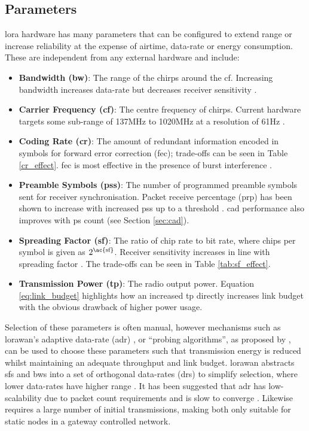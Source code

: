 \subsection{Parameters}
\ac{lora} hardware has many parameters that can be configured to extend range or increase reliability at the expense of airtime, data-rate or energy consumption. These are independent from any external hardware and include:
\begin{itemize}
    \item \textbf{Bandwidth (\ac{bw})}: The range of the chirps around the \ac{cf}. Increasing bandwidth increases data-rate but decreases receiver sensitivity \cite{3YP:STUDY_OF_LORA}.
    \item \textbf{Carrier Frequency (\ac{cf})}: The centre frequency of chirps. Current hardware targets some sub-range of 137MHz to 1020MHz at a resolution of 61Hz \cite{3YP:LORA_SX12}. 
    \item \textbf{Coding Rate (\ac{cr})}: The amount of redundant information encoded in symbols for forward error correction (\ac{fec}); trade-offs can be seen in Table \ref{cr_effect}. \ac{fec} is most effective in the presence of burst interference \cite{3YP:LORA_MOD_BASICS}.
    \item \textbf{Preamble Symbols (\ac{ps}s)}: The number of programmed preamble symbols sent for receiver synchronisation. Packet receive percentage (\ac{prp}) has been shown to increase with increased \ac{ps}s up to a threshold \cite{3YP:LORA_PERFORMANCE}. \ac{cad} performance also improves with \ac{ps} count (see Section \ref{sec:cad}).
    \item \textbf{Spreading Factor (\ac{sf})}: The ratio of chip rate to bit rate, where chips per symbol is given as $2^{\text{\ac{sf}}}$. Receiver sensitivity increases in line with spreading factor \cite{3YP:LORA_SX12}. The trade-offs can be seen in Table \ref{tab:sf_effect}.
    \item \textbf{Transmission Power (\ac{tp})}: The radio output power. Equation \ref{eq:link_budget} highlights how an increased \ac{tp} directly increases link budget with the obvious drawback of higher power usage. 
\end{itemize}

\label{sec:parameter_selection}
Selection of these parameters is often manual, however mechanisms such as \ac{lorawan}'s adaptive data-rate (\ac{adr}) \cite{3YP:LORAWAN}, or ``probing algorithms'', as proposed by \cite{3YP:CHOOSING_LORA_PARAMETERS}, can be used to choose these parameters such that transmission energy is reduced whilst maintaining an adequate throughput and link budget. \ac{lorawan} abstracts \ac{sf}s and \ac{bw}s into a set of orthogonal data-rates (\ac{dr}s) to simplify selection, where lower data-rates have higher range \cite{3YP:LORAWAN_REGIONAL_PARAMS}. It has been suggested that \ac{adr} has low-scalability due to packet count requirements \cite{3YP:LORAWAN_ADR} and is slow to converge \cite{3YP:LORAWAN_ADR_AGILITY}. Likewise \cite{3YP:CHOOSING_LORA_PARAMETERS} requires a large number of initial transmissions, making both only suitable for static nodes in a gateway controlled network.

